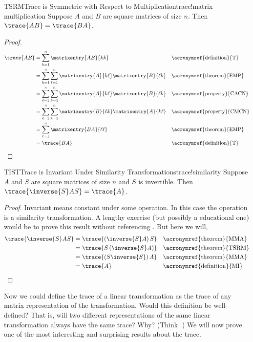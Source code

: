 %
\begin{theorem}{TSRM}{Trace is Symmetric with Respect to Multiplication}{trace!matrix multiplication}
Suppose $A$ and $B$ are square matrices of size $n$.  Then $\trace{AB}=\trace{BA}$.
\end{theorem} 
%
\begin{proof}
%
\begin{align*}
\trace{AB}
&=\sum_{k=1}^n \matrixentry{AB}{kk}&&\text{\acronymref{definition}{T}}\\
&=\sum_{k=1}^n \sum_{\ell=1}^n \matrixentry{A}{k\ell}\matrixentry{B}{\ell k}&&\text{\acronymref{theorem}{EMP}}\\
&=\sum_{\ell=1}^n \sum_{k=1}^n \matrixentry{A}{k\ell}\matrixentry{B}{\ell k}&&\text{\acronymref{property}{CACN}}\\
&=\sum_{\ell=1}^n \sum_{k=1}^n \matrixentry{B}{\ell k}\matrixentry{A}{k\ell}&&\text{\acronymref{property}{CMCN}}\\
&=\sum_{\ell=1}^{n} \matrixentry{BA}{\ell\ell}&&\text{\acronymref{theorem}{EMP}}\\
&=\trace{BA}&&\text{\acronymref{definition}{T}}
\end{align*}
%
\end{proof}
%
\begin{theorem}{TIST}{Trace is Invariant Under Similarity Transformations}{trace!similarity}
Suppose $A$ and $S$ are square matrices of size $n$ and $S$ is invertible.  Then $\trace{\inverse{S}AS}=\trace{A}$.
\end{theorem}
%
\begin{proof} Invariant means constant under some operation.  In this case the operation is a similarity transformation.  A lengthy exercise (but possibly a educational one) would be to prove this result without referencing .  But here we will,
%
\begin{align*}
\trace{\inverse{S}AS}
&=\trace{\left(\inverse{S}A\right)S}&&\text{\acronymref{theorem}{MMA}}\\
&=\trace{S\left(\inverse{S}A\right)}&&\text{\acronymref{theorem}{TSRM}}\\
&=\trace{\left(S\inverse{S}\right)A}&&\text{\acronymref{theorem}{MMA}}\\
&=\trace{A}&&\text{\acronymref{definition}{MI}}
\end{align*}
%
\end{proof}
%
Now we could define the trace of a linear transformation as the trace of any matrix representation of the transformation. Would this definition be well-defined?  That is, will two different representations of the same linear transformation always have the same trace? Why? (Think .) We will now prove one of the most interesting and surprising results about the trace.
